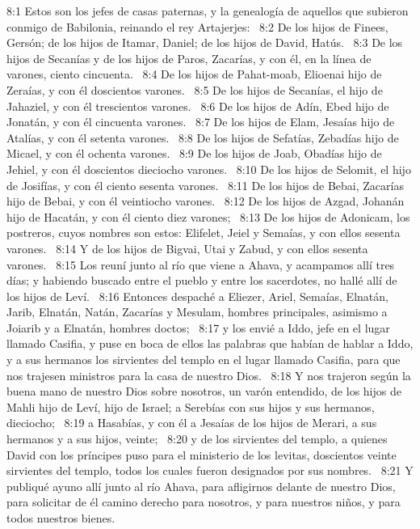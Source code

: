 8:1 Estos son los jefes de casas paternas, y la genealogía de aquellos que subieron conmigo de Babilonia, reinando el rey Artajerjes:  
8:2 De los hijos de Finees, Gersón; de los hijos de Itamar, Daniel; de los hijos de David, Hatús.  
8:3 De los hijos de Secanías y de los hijos de Paros, Zacarías, y con él, en la línea de varones, ciento cincuenta.  
8:4 De los hijos de Pahat-moab, Elioenai hijo de Zeraías, y con él doscientos varones.  
8:5 De los hijos de Secanías, el hijo de Jahaziel, y con él trescientos varones.  
8:6 De los hijos de Adín, Ebed hijo de Jonatán, y con él cincuenta varones.  
8:7 De los hijos de Elam, Jesaías hijo de Atalías, y con él setenta varones.  
8:8 De los hijos de Sefatías, Zebadías hijo de Micael, y con él ochenta varones.  
8:9 De los hijos de Joab, Obadías hijo de Jehiel, y con él doscientos dieciocho varones.  
8:10 De los hijos de Selomit, el hijo de Josifías, y con él ciento sesenta varones.  
8:11 De los hijos de Bebai, Zacarías hijo de Bebai, y con él veintiocho varones.  
8:12 De los hijos de Azgad, Johanán hijo de Hacatán, y con él ciento diez varones;  
8:13 De los hijos de Adonicam, los postreros, cuyos nombres son estos: Elifelet, Jeiel y Semaías, y con ellos sesenta varones.  
8:14 Y de los hijos de Bigvai, Utai y Zabud, y con ellos sesenta varones.  
8:15 Los reuní junto al río que viene a Ahava, y acampamos allí tres días; y habiendo buscado entre el pueblo y entre los sacerdotes, no hallé allí de los hijos de Leví.  
8:16 Entonces despaché a Eliezer, Ariel, Semaías, Elnatán, Jarib, Elnatán, Natán, Zacarías y Mesulam, hombres principales, asimismo a Joiarib y a Elnatán, hombres doctos;  
8:17 y los envié a Iddo, jefe en el lugar llamado Casifia, y puse en boca de ellos las palabras que habían de hablar a Iddo, y a sus hermanos los sirvientes del templo en el lugar llamado Casifia, para que nos trajesen ministros para la casa de nuestro Dios.  
8:18 Y nos trajeron según la buena mano de nuestro Dios sobre nosotros, un varón entendido, de los hijos de Mahli hijo de Leví, hijo de Israel; a Serebías con sus hijos y sus hermanos, dieciocho;  
8:19 a Hasabías, y con él a Jesaías de los hijos de Merari, a sus hermanos y a sus hijos, veinte;  
8:20 y de los sirvientes del templo, a quienes David con los príncipes puso para el ministerio de los levitas, doscientos veinte sirvientes del templo, todos los cuales fueron designados por sus nombres.  
8:21 Y publiqué ayuno allí junto al río Ahava, para afligirnos delante de nuestro Dios, para solicitar de él camino derecho para nosotros, y para nuestros niños, y para todos nuestros bienes.  
